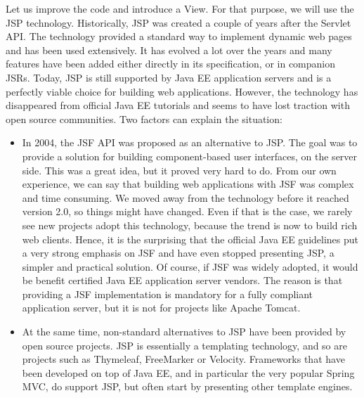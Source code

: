 Let us improve the code and introduce a View. For that purpose, we will use the \ac{JSP} technology. Historically, JSP was created a couple of years after the Servlet API. The technology provided a standard way to implement dynamic web pages and has been used extensively. It has evolved a lot over the years and many features have been added either directly in its specification, or in companion \ac{JSR}s. Today, JSP is still supported by Java EE application servers and is a perfectly viable choice for building web applications. However, the technology has disappeared from official Java EE tutorials and seems to have lost traction with open source communities. Two factors can explain the situation:


\begin{itemize}
\item In 2004, the \ac{JSF} API was proposed as an alternative to JSP. The goal was to provide a solution for building component-based user interfaces, on the server side. This was a great idea, but it proved very hard to do. From our own experience, we can say that building web applications with \ac{JSF} was complex and time consuming. We moved away from the technology before it reached version 2.0, so things might have changed. Even if that is the case, we rarely see new projects adopt this technology, because the trend is now to build rich web clients. Hence, it is the surprising that the official Java EE guidelines put a very strong emphasis on \ac{JSF} and have even stopped presenting \ac{JSP}, a simpler and practical solution. Of course, if \ac{JSF} was widely adopted, it would be benefit certified Java EE application server vendors. The reason is that providing a \ac{JSF} implementation is mandatory for a fully compliant application server, but it is not for projects like Apache Tomcat.
\item At the same time, non-standard alternatives to \ac{JSP} have been provided by open source projects. \ac{JSP} is essentially a templating technology, and so are projects such as Thymeleaf, FreeMarker or Velocity. Frameworks that have been developed on top of Java EE, and in particular the very popular Spring MVC, do support \ac{JSP}, but often start by presenting other template engines.
\end{itemize}

